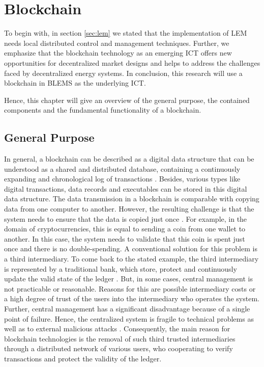 \section{Blockchain}
\label{sec:about_blockchain}

To begin with, in section \ref{sec:lem} we stated that the implementation of LEM
needs local distributed control and management techniques. Further, we emphasize
that the blockchain technology as an emerging ICT offers new opportunities for decentralized
market designs and helps to address the challenges faced by decentralized energy systems. 
In conclusion, this research will use a blockchain in BLEMS
as the underlying ICT. 

Hence, this chapter will give an overview of the general purpose, 
the contained components and the fundamental functionality of a blockchain. 

\subsection{General Purpose}
In general, a blockchain can be described as a digital data structure that can be understood as a shared and 
distributed database, containing a continuously expanding and chronological log of transactions . 
Besides, various types like digital transactions, data records and executables can be stored in this digital data structure. 
The data transmission in a blockchain is comparable with copying data from one computer to another. However, the resulting challenge 
is that the system needs to ensure that the data is copied just once . 
For example, in the domain of cryptocurrencies, this is equal to sending a coin from one wallet to another. 
In this case, the system needs to validate that this coin is spent just once and there is no double-spending. 
A conventional solution for this problem is a third intermediary. To come back to the stated example, the third 
intermediary is represented by a traditional bank, which store, protect and continuously update the valid state of 
the ledger . But, in some cases, central management is not practicable or reasonable. 
Reasons for this are possible intermediary costs or a high degree of trust of the users into the intermediary who operates 
the system. Further, central management has a significant disadvantage because of a single point of failure. 
Hence, the centralized system is fragile to technical problems as well as to external malicious attacks .
Consequently, the main reason for blockchain technologies is the removal of such third 
trusted intermediaries through a distributed network of various users, who cooperating 
to verify transactions and protect the validity of the ledger.

